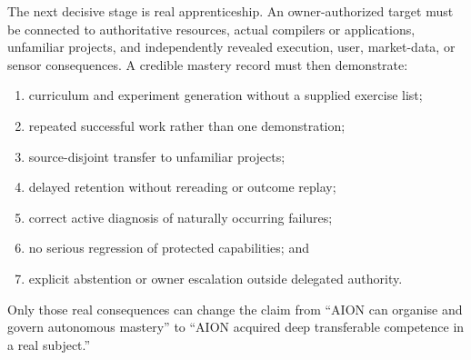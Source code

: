 The next decisive stage is real apprenticeship.  An owner-authorized target
must be connected to authoritative resources, actual compilers or applications,
unfamiliar projects, and independently revealed execution, user, market-data,
or sensor consequences.  A credible mastery record must then demonstrate:
\begin{enumerate}
    \item curriculum and experiment generation without a supplied exercise list;
    \item repeated successful work rather than one demonstration;
    \item source-disjoint transfer to unfamiliar projects;
    \item delayed retention without rereading or outcome replay;
    \item correct active diagnosis of naturally occurring failures;
    \item no serious regression of protected capabilities; and
    \item explicit abstention or owner escalation outside delegated authority.
\end{enumerate}
Only those real consequences can change the claim from ``AION can organise and
govern autonomous mastery'' to ``AION acquired deep transferable competence in
a real subject.''
